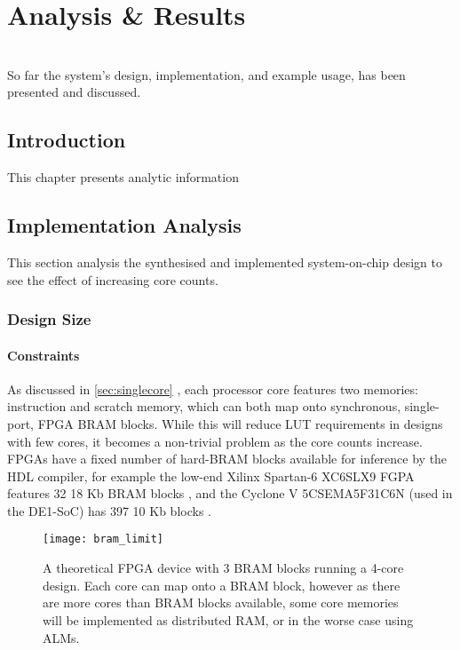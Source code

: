\chapter{Analysis \& Results}
\startcontents[chapters]
\noindent\\
So far the system's design, implementation, and example usage, has been presented and discussed.

\section{Introduction}
This chapter presents analytic information

\section{Implementation Analysis}
This section analysis the synthesised and implemented system-on-chip design to see the effect of increasing core counts.

\subsection{Design Size}
\subsubsection{Constraints}
As discussed in \cref{sec:singlecore} , each processor core features two memories: instruction and scratch memory, which can both map onto synchronous, single-port, FPGA BRAM blocks. While this will reduce LUT requirements in designs with few cores, it becomes a non-trivial problem as the core counts increase. FPGAs have a fixed number of hard-BRAM blocks available for inference by the HDL compiler, for example the low-end Xilinx Spartan-6 XC6SLX9 FGPA features 32 18 Kb BRAM blocks \cite[p.~2]{s6fam}, and the Cyclone V 5CSEMA5F31C6N (used in the DE1-SoC) has 397 10 Kb blocks \cite[p.~22]{cvfam}.

\begin{figure}[h]
\centering
\texttt{[image: bram\_limit]}
\caption{A theoretical FPGA device with 3 BRAM blocks running a 4-core design. Each core can map onto a BRAM block, however as there are more cores than BRAM blocks available, some core memories will be implemented as distributed RAM, or in the worse case using ALMs.}
\label{fig:bram_limit}
\end{figure}

